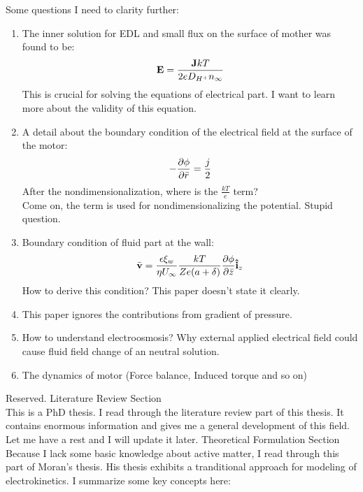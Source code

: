 \documentclass[fontsize=11pt, %
                             paper=a4, %
                             twoside, %
                             captions=tableheading,
                             index=totoc,
                             hyperref]{labbook}
\begin{document}
\begin{addmargin}[4cm]{0cm}
Some questions I need to clarity further:
\begin{enumerate}
\item
The inner solution for EDL and small flux on the surface of mother was found to be\cite{Kline2006}:
\begin{equation}
\mathbf{E} = \frac{\mathbf{J} k T}{2e D_{H^+}n_\infty}
\end{equation}
This is crucial for solving the equations of electrical part. I want to learn more about the validity of this equation.
\item
A detail about the boundary condition of the electrical field at the surface of the motor:
\begin{equation}
-\frac{\partial \phi}{\partial \bar{r}}=\frac{j}{2}
\end{equation}
After the nondimensionalization, where is the $\frac{kT}{e}$ term?\\
Come on, the term is used for nondimensionalizing the potential. Stupid question.
\item
Boundary condition of fluid part at the wall:
\begin{equation}
\bar{\mathbf{v}}=\frac{\epsilon\xi_w}{\eta U_\infty}\frac{kT}{Ze(a+\delta)}\frac{\partial \phi}{\partial \bar z}\mathbf{\hat{i}}_z
\end{equation}
How to derive this condition? This paper doesn't state it clearly.
\item
This paper ignores the contributions from gradient of pressure. 
\item
How to understand electroosmosis? Why external applied electrical field could cause fluid field change of an neutral solution.
\item
The dynamics of motor (Force balance, Induced torque and so on)
\end{enumerate}  
Reserved.
Literature Review Section\\
This is a PhD thesis. I read through the literature review part of this thesis. It contains enormous information and gives me a general development of this field. Let me have a rest and I will update it later.
Theoretical Formulation Section\\
Because I lack some basic knowledge about active matter, I read through this part of Moran's thesis\cite{Moran2013}. His thesis exhibits a tranditional approach for modeling of electrokinetics. I summarize some key concepts here:

\end{addmargin}
\end{document}
